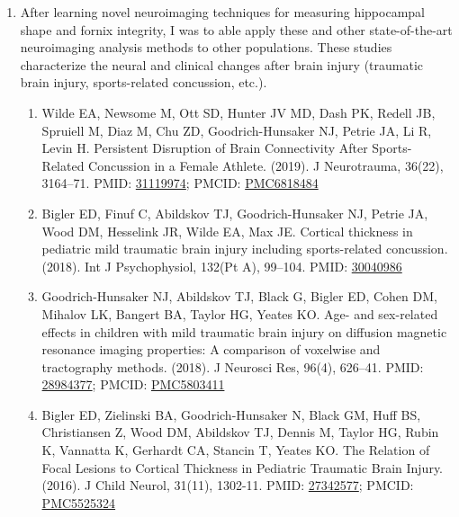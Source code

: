 \documentclass{nihbiosketch}
\begin{document}
\begin{enumerate}
\begin{enumerate}
	      \end{enumerate}   

    \item After learning novel neuroimaging techniques for measuring hippocampal shape and fornix integrity, I was to able apply these and other state-of-the-art neuroimaging analysis methods to other populations. These studies characterize the neural and clinical changes after brain injury (traumatic brain injury, sports-related concussion, etc.).
	      
	      \begin{enumerate}   
	      	
	      	\item Wilde EA, Newsome M, Ott SD, Hunter JV MD, Dash PK, Redell JB, Spruiell M, Diaz M, Chu ZD, Goodrich-Hunsaker NJ, Petrie JA, Li R, Levin H. Persistent Disruption of Brain Connectivity After Sports-Related Concussion in a Female Athlete. (2019). J Neurotrauma,  36(22), 3164--71. PMID: \href{https:/pubmed.ncbi.nlm.nih.gov/31119974}{31119974}; PMCID: \href{https://www.ncbi.nlm.nih.gov/pmc/articles/PMC6818484}{PMC6818484 }
	      	      
	      	\item Bigler ED, Finuf C, Abildskov TJ, Goodrich-Hunsaker NJ, Petrie JA, Wood DM, Hesselink JR, Wilde EA, Max JE. Cortical thickness in pediatric mild traumatic brain injury including sports-related concussion. (2018). Int J Psychophysiol, 132(Pt A), 99--104. PMID: \href{https:/pubmed.ncbi.nlm.nih.gov/30040986}{30040986}
	      	      
	      	\item  Goodrich-Hunsaker NJ, Abildskov TJ, Black G, Bigler ED, Cohen DM, Mihalov LK, Bangert BA, Taylor HG, Yeates KO. Age- and sex-related effects in children with mild traumatic brain injury on diffusion magnetic resonance imaging properties: A comparison of voxelwise and tractography methods. (2018). J Neurosci Res, 96(4), 626--41. PMID: \href{https:/pubmed.ncbi.nlm.nih.gov/28984377}{28984377}; PMCID: \href{https://www.ncbi.nlm.nih.gov/pmc/articles/PMC5803411}{PMC5803411}
	      	
	      	\item Bigler ED, Zielinski BA, Goodrich-Hunsaker N, Black GM, Huff BS, Christiansen Z, Wood DM, Abildskov TJ, Dennis M, Taylor HG, Rubin K, Vannatta K, Gerhardt CA, Stancin T, Yeates KO. The Relation of Focal Lesions to Cortical Thickness in Pediatric Traumatic Brain Injury. (2016). J Child Neurol, 31(11), 1302-11. PMID: \href{https:/pubmed.ncbi.nlm.nih.gov/27342577}{27342577}; PMCID: \href{https://www.ncbi.nlm.nih.gov/pmc/articles/PMC5525324}{PMC5525324}
	      	      
	      \end{enumerate} 
\end{enumerate}
\end{document}
